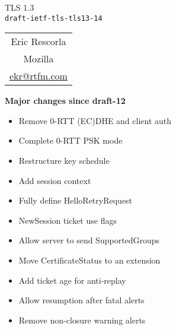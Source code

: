 \documentclass[helvetica]{seminar}
\newcommand{\heading}[1]{%
  \begin{center} 
    \large\bf 
    #1 
  \end{center} 
  \vspace{.4 in}}
\begin{document}
\begin{slide}
\begin{center}
\vspace{.5 in}
\LARGE{{\bf}TLS 1.3\\{\small \verb^draft-ietf-tls-tls13-14^}}\\
\vspace{.2in}
\large{
\begin{tabular}{c}
Eric Rescorla\\
Mozilla\\
\url{ekr@rtfm.com}
\end{tabular}
}
\end{center}
\end{slide}

\centerslidesfalse 

\begin{slide}
\heading{Major changes since draft-12}

\vspace{-3ex}
\begin{itemize}
\item Remove 0-RTT (EC)DHE and client auth
\item Complete 0-RTT PSK mode
\item Restructure key schedule
\item Add session context
\item Fully define HelloRetryRequest
\item NewSession ticket use flags
\item Allow server to send SupportedGroups
\item Move CertificateStatus to an extension
\item Add ticket age for anti-replay
\item Allow resumption after fatal alerts
\item Remove non-closure warning alerts
\end{itemize}

\end{slide}
\end{document}
